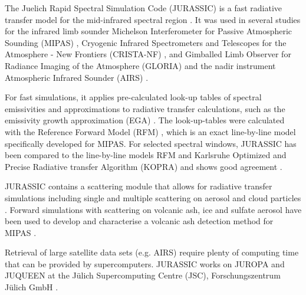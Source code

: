 The Juelich Rapid Spectral Simulation Code (JURASSIC) is a fast radiative transfer model for the mid-infrared spectral region \citep{Hoffmann2006}. It was used in several studies for the infrared limb sounder Michelson Interferometer for Passive Atmospheric Sounding (MIPAS) \citep{Hoffmann2005, Hoffmann2008}, Cryogenic Infrared Spectrometers and Telescopes for the Atmosphere - New Frontiers (CRISTA-NF) \citep{Hoffmann2009, Weigel2010}, and Gimballed Limb Observer for Radiance Imaging of the Atmosphere (GLORIA) \citep{Ungermann2011a} and the nadir instrument Atmospheric Infrared Sounder (AIRS) \citep{Hoffmann2009b, Grimsdell2010,Hoffmann2013}.

For fast simulations, it applies pre-calculated look-up tables of spectral emissivities and approximations to radiative transfer calculations, such as the emissivity growth approximation (EGA) \citep{Weinreb1973,Gordley1981,Marshall1994}.%
The look-up-tables were calculated with the Reference Forward Model (RFM) \citep{Dudhia2002,Dudhia2014}, which is an exact line-by-line model specifically developed for MIPAS. For selected spectral windows, JURASSIC has been compared to the line-by-line models RFM and Karlsruhe Optimized and Precise Radiative transfer Algorithm (KOPRA) \citep{Stiller2000,Stiller2002,Hoepfner2005} and shows good agreement \citep{Griessbach2013}.

JURASSIC contains a scattering module that allows for radiative transfer simulations including single and multiple scattering on aerosol and cloud particles \citep{Griessbach2012,Griessbach2013}. Forward simulations with scattering on volcanic ash, ice and sulfate aerosol have been used to develop and characterise a volcanic ash detection method for MIPAS \citep{Griessbach2012a,Griessbach2014}.

Retrieval of large satellite data sets (e.g. AIRS) require plenty of computing time that can be provided by supercomputers. JURASSIC works on {JUROPA} and {JUQUEEN} at the J\"u{}lich Supercomputing Centre (JSC), Forschungszentrum J\"u{}lich GmbH \citep{Hoffmann2014}.

